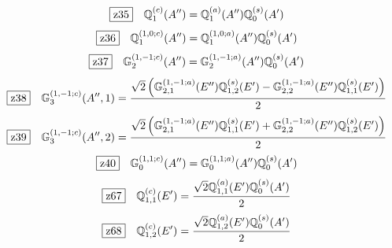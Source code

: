 \documentclass[fleqn,10pt,landscape]{jsarticle}
\begin{document}
\begin{dmath*}
\hspace*{3mm}\fbox{z35}\quad \mathbb{Q}_{1}^{(c)}(A^{\prime\prime})=\mathbb{Q}_{1}^{(a)}(A^{\prime\prime}) \mathbb{Q}_{0}^{(s)}(A^{\prime})
\end{dmath*}
\begin{dmath*}
\hspace*{3mm}\fbox{z36}\quad \mathbb{Q}_{1}^{(1,0;c)}(A^{\prime\prime})=\mathbb{Q}_{1}^{(1,0;a)}(A^{\prime\prime}) \mathbb{Q}_{0}^{(s)}(A^{\prime})
\end{dmath*}
\begin{dmath*}
\hspace*{3mm}\fbox{z37}\quad \mathbb{G}_{2}^{(1,-1;c)}(A^{\prime\prime})=\mathbb{G}_{2}^{(1,-1;a)}(A^{\prime\prime}) \mathbb{Q}_{0}^{(s)}(A^{\prime})
\end{dmath*}
\begin{dmath*}
\hspace*{3mm}\fbox{z38}\quad \mathbb{G}_{3}^{(1,-1;c)}(A^{\prime\prime},1)=\frac{\sqrt{2} \left(\mathbb{G}_{2,1}^{(1,-1;a)}(E^{\prime\prime}) \mathbb{Q}_{1,2}^{(s)}(E^{\prime}) - \mathbb{G}_{2,2}^{(1,-1;a)}(E^{\prime\prime}) \mathbb{Q}_{1,1}^{(s)}(E^{\prime})\right)}{2}
\end{dmath*}
\begin{dmath*}
\hspace*{3mm}\fbox{z39}\quad \mathbb{G}_{3}^{(1,-1;c)}(A^{\prime\prime},2)=\frac{\sqrt{2} \left(\mathbb{G}_{2,1}^{(1,-1;a)}(E^{\prime\prime}) \mathbb{Q}_{1,1}^{(s)}(E^{\prime}) + \mathbb{G}_{2,2}^{(1,-1;a)}(E^{\prime\prime}) \mathbb{Q}_{1,2}^{(s)}(E^{\prime})\right)}{2}
\end{dmath*}
\begin{dmath*}
\hspace*{3mm}\fbox{z40}\quad \mathbb{G}_{0}^{(1,1;c)}(A^{\prime\prime})=\mathbb{G}_{0}^{(1,1;a)}(A^{\prime\prime}) \mathbb{Q}_{0}^{(s)}(A^{\prime})
\end{dmath*}
\begin{dmath*}
\hspace*{3mm}\fbox{z67}\quad \mathbb{Q}_{1,1}^{(c)}(E^{\prime})=\frac{\sqrt{2} \mathbb{Q}_{1,1}^{(a)}(E^{\prime}) \mathbb{Q}_{0}^{(s)}(A^{\prime})}{2}
\end{dmath*}
\begin{dmath*}
\hspace*{3mm}\fbox{z68}\quad \mathbb{Q}_{1,2}^{(c)}(E^{\prime})=\frac{\sqrt{2} \mathbb{Q}_{1,2}^{(a)}(E^{\prime}) \mathbb{Q}_{0}^{(s)}(A^{\prime})}{2}
\end{dmath*}
\end{document}
